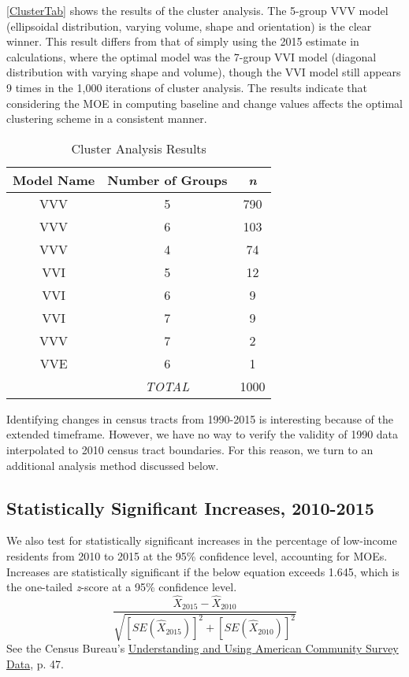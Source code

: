 \documentclass[paper=letterpaper, fontsize=11pt]{scrartcl}
\begin{document}
\autoref{ClusterTab} shows the results of the cluster analysis. The 5-group VVV model (ellipsoidal distribution, varying volume, shape and orientation) is the clear winner. This result differs from that of simply using the 2015 estimate in calculations, where the optimal model was the 7-group VVI model (diagonal distribution with varying shape and volume), though the VVI model still appears 9 times in the 1,000 iterations of cluster analysis. The results indicate that considering the MOE in computing baseline and change values affects the optimal clustering scheme in a consistent manner.

\begin{table}[h]
	\caption{Cluster Analysis Results}
	\label{ClusterTab}
	\centering
		\begin{tabular}{||c c c||} 
		\hline
		Model Name & Number of Groups & \textit{n} \\ [0.5ex] 
		\hline\hline
		VVV & 5 & 790 \\ 
		\hline
		VVV & 6 & 103 \\
		\hline
		VVV & 4 & 74 \\
		\hline
		VVI & 5 & 12 \\
		\hline
		VVI & 6 & 9 \\
		\hline
		VVI & 7 & 9 \\
		\hline
		VVV & 7 & 2 \\
		\hline
		VVE & 6 & 1 \\
		\hline \hline
		& \textit{TOTAL} & 1000 \\ [0.5ex] 
		\hline
	\end{tabular}
\end{table} 

Identifying changes in census tracts from 1990-2015 is interesting because of the extended timeframe. However, we have no way to verify the validity of 1990 data interpolated to 2010 census tract boundaries. For this reason, we turn to an additional analysis method discussed below. 

\subsection{Statistically Significant Increases, 2010-2015}
We also test for statistically significant increases in the percentage of low-income residents from 2010 to 2015 at the 95\% confidence level, accounting for MOEs. Increases are statistically significant if the below equation exceeds 1.645, which is the one-tailed \textit{z}-score at a 95\% confidence level.
\begin{equation}
\frac{\hat{X}_{2015}-\hat{X}_{2010}}{\sqrt{[SE(\hat{X}_{2015})]^2 + [SE(\hat{X}_{2010})]^2}}
\end{equation}
See the Census Bureau's \href{https://www.census.gov/content/dam/Census/library/publications/2018/acs/acs_general_handbook_2018.pdf}{Understanding and Using American Community Survey Data}, p. 47.
\end{document}
